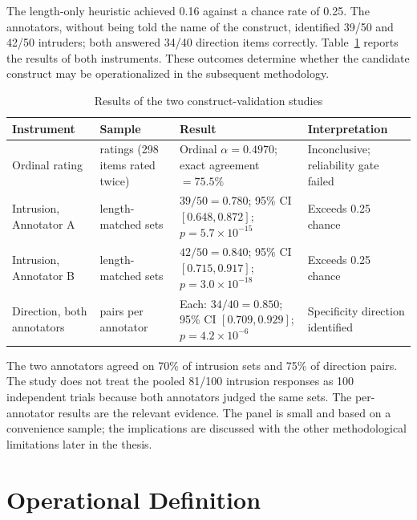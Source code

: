 The length-only heuristic achieved 0.16 against a chance rate of 0.25. The annotators, without being told the name of the construct, identified 39/50 and 42/50 intruders; both answered 34/40 direction items correctly. Table~\ref{tab:human-validation} reports the results of both instruments. These outcomes determine whether the candidate construct may be operationalized in the subsequent methodology.

\begin{table}[H]
\centering
\caption{Results of the two construct-validation studies}
\label{tab:human-validation}
\footnotesize
\setlength{\tabcolsep}{3.5pt}
\renewcommand{\arraystretch}{1.18}
\begin{tabularx}{\textwidth}{@{}>{\raggedright\arraybackslash}p{} >{\raggedright\arraybackslash}p{} >{\raggedright\arraybackslash}p{} >{\raggedright\arraybackslash}X@{}}
\toprule
\textbf{Instrument} & \textbf{Sample} & \textbf{Result} & \textbf{Interpretation} \\
\midrule
Ordinal rating & 598 ratings (298 items rated twice) & Ordinal $\alpha=0.4970$; exact agreement $=75.5\%$ & Inconclusive; reliability gate failed \\
Intrusion, Annotator A & 50 length-matched sets & $39/50=0.780$; 95\% CI $[0.648, 0.872]$; $p=5.7\times10^{-15}$ & Exceeds 0.25 chance \\
Intrusion, Annotator B & 50 length-matched sets & $42/50=0.840$; 95\% CI $[0.715, 0.917]$; $p=3.0\times10^{-18}$ & Exceeds 0.25 chance \\
Direction, both annotators & 40 pairs per annotator & Each: $34/40=0.850$; 95\% CI $[0.709, 0.929]$; $p=4.2\times10^{-6}$ & Specificity direction identified \\
\bottomrule
\end{tabularx}
\end{table}

The two annotators agreed on 70\% of intrusion sets and 75\% of direction pairs. The study does not treat the pooled 81/100 intrusion responses as 100 independent trials because both annotators judged the same sets. The per-annotator results are the relevant evidence. The panel is small and based on a convenience sample; the implications are discussed with the other methodological limitations later in the thesis.

\section{Operational Definition}
\label{sec:ch3-construct-operationalization}

